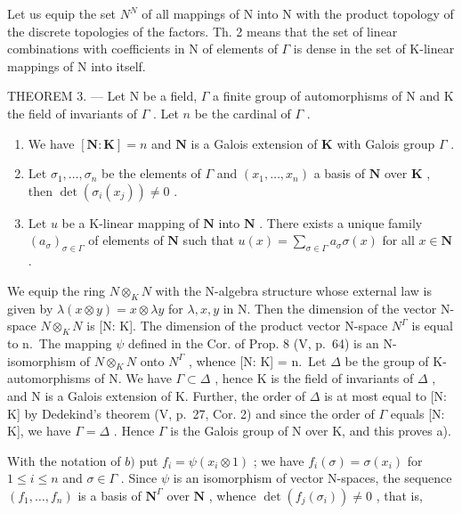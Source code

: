 Let us equip the set \(N^{N}\) of all mappings of N into N with the product topology of the discrete topologies of the factors. Th. 2 means that the set of linear combinations with coefficients in N of elements of \(\Gamma\) is dense in the set of K-linear mappings of N into itself.

THEOREM 3. --- Let N be a field, \(\Gamma\) a finite group of automorphisms of N and K the field of invariants of \(\Gamma\) . Let \(n\) be the cardinal of \(\Gamma\) .

\begin{enumerate}
\def\labelenumi{\alph{enumi})}
\item
  We have \([\mathbf{N}:\mathbf{K}] = n\) and \(\mathbf{N}\) is a Galois extension of \(\mathbf{K}\) with Galois group \(\Gamma\) .
\item
  Let \(\sigma_1, \ldots, \sigma_n\) be the elements of \(\Gamma\) and \((x_1, \ldots, x_n)\) a basis of \(\mathbf{N}\) over \(\mathbf{K}\) , then \(\det (\sigma_i(x_j)) \neq 0\) .
\item
  Let \(u\) be a K-linear mapping of \(\mathbf{N}\) into \(\mathbf{N}\) . There exists a unique family \((a_{\sigma})_{\sigma \in \Gamma}\) of elements of \(\mathbf{N}\) such that \(u(x) = \sum_{\sigma \in \Gamma} a_{\sigma} \sigma(x)\) for all \(x \in \mathbf{N}\) .
\end{enumerate}

We equip the ring \(N \otimes_{K} N\) with the N-algebra structure whose external law is given by \(\lambda(x \otimes y) = x \otimes \lambda y\) for \(\lambda, x, y\) in N. Then the dimension of the vector N-space \(N \otimes_{K} N\) is {[}N: K{]}. The dimension of the product vector N-space \(N^{\Gamma}\) is equal to n.~The mapping \(\psi\) defined in the Cor. of Prop. 8 (V, p.~64) is an N-isomorphism of \(N \otimes_{K} N\) onto \(N^{\Gamma}\) , whence {[}N: K{]} = n.~Let \(\Delta\) be the group of K-automorphisms of N. We have \(\Gamma \subset \Delta\) , hence K is the field of invariants of \(\Delta\) , and N is a Galois extension of K. Further, the order of \(\Delta\) is at most equal to {[}N: K{]} by Dedekind's theorem (V, p.~27, Cor. 2) and since the order of \(\Gamma\) equals {[}N: K{]}, we have \(\Gamma = \Delta\) . Hence \(\Gamma\) is the Galois group of N over K, and this proves a).

With the notation of \(b)\) put \(f_{i} = \psi(x_{i} \otimes 1)\) ; we have \(f_{i}(\sigma) = \sigma(x_{i})\) for \(1 \leqslant i \leqslant n\) and \(\sigma \in \Gamma\) . Since \(\psi\) is an isomorphism of vector N-spaces, the sequence \((f_{1}, \ldots, f_{n})\) is a basis of \(\mathbf{N}^{\Gamma}\) over \(\mathbf{N}\) , whence \(\det(f_{j}(\sigma_{i})) \neq 0\) , that is,

